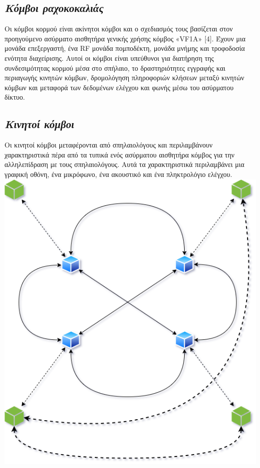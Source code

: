 \documentclass[12pt]{article}
\begin{document}
\begin{multicols}{2}
    \subsection{\textit{\small Κόμβοι ραχοκοκαλιάς}}
        Οι κόμβοι κορμού είναι ακίνητοι κόμβοι και ο σχεδιασμός τους
        βασίζεται στον προηγούμενο ασύρματο αισθητήρα γενικής χρήσης
        κόμβος «VF1A» [4]. Έχουν μια μονάδα επεξεργαστή, ένα RF
        μονάδα πομποδέκτη, μονάδα μνήμης και τροφοδοσία
        ενότητα διαχείρισης. Αυτοί οι κόμβοι είναι υπεύθυνοι για
        διατήρηση της συνδεσιμότητας κορμού μέσα στο σπήλαιο, το
        δραστηριότητες εγγραφής και περιαγωγής κινητών κόμβων,
        δρομολόγηση πληροφοριών κλήσεων μεταξύ κινητών κόμβων και
        μεταφορά των δεδομένων ελέγχου και φωνής μέσω του ασύρματου
        δίκτυο.
    \subsection{\textit{\small Κινητοί κόμβοι}}
        Οι κινητοί κόμβοι μεταφέρονται από σπηλαιολόγους και περιλαμβάνουν
        χαρακτηριστικά πέρα από τα τυπικά ενός ασύρματου αισθητήρα
        κόμβος για την αλληλεπίδραση με τους σπηλαιολόγους. Αυτά τα χαρακτηριστικά
        περιλαμβάνει μια γραφική οθόνη, ένα μικρόφωνο, ένα ακουστικό
        και ένα πληκτρολόγιο ελέγχου.
        \includegraphics*[scale=.4]{img/ICWMSN-WMSNpng.png}


\end{multicols}
\end{document}
